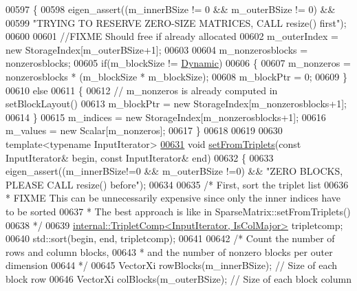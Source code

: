 \begin{DoxyCode}
00597     \{
00598       eigen\_assert((m\_innerBSize != 0 && m\_outerBSize != 0) &&
00599           \textcolor{stringliteral}{"TRYING TO RESERVE ZERO-SIZE MATRICES, CALL resize() first"});
00600 
00601       \textcolor{comment}{//FIXME Should free if already allocated}
00602       m\_outerIndex = \textcolor{keyword}{new} StorageIndex[m\_outerBSize+1];
00603 
00604       m\_nonzerosblocks = nonzerosblocks;
00605       \textcolor{keywordflow}{if}(m\_blockSize != \hyperlink{namespace_eigen_ad81fa7195215a0ce30017dfac309f0b2}{Dynamic})
00606       \{
00607         m\_nonzeros = nonzerosblocks * (m\_blockSize * m\_blockSize);
00608         m\_blockPtr = 0;
00609       \}
00610       \textcolor{keywordflow}{else}
00611       \{
00612         \textcolor{comment}{// m\_nonzeros  is already computed in setBlockLayout()}
00613         m\_blockPtr = \textcolor{keyword}{new} StorageIndex[m\_nonzerosblocks+1];
00614       \}
00615       m\_indices = \textcolor{keyword}{new} StorageIndex[m\_nonzerosblocks+1];
00616       m\_values = \textcolor{keyword}{new} Scalar[m\_nonzeros];
00617     \}
00618 
00619 
00630     \textcolor{keyword}{template}<\textcolor{keyword}{typename} InputIterator>
\hyperlink{group___sparse_core___module_aa148b63f89555f4eed312638abe597eb}{00631}     \textcolor{keywordtype}{void} \hyperlink{group___sparse_core___module_aa148b63f89555f4eed312638abe597eb}{setFromTriplets}(\textcolor{keyword}{const} InputIterator& begin, \textcolor{keyword}{const} InputIterator& end)
00632     \{
00633       eigen\_assert((m\_innerBSize!=0 && m\_outerBSize !=0) && \textcolor{stringliteral}{"ZERO BLOCKS, PLEASE CALL resize() before"});
00634 
00635       \textcolor{comment}{/* First, sort the triplet list}
00636 \textcolor{comment}{        * FIXME This can be unnecessarily expensive since only the inner indices have to be sorted}
00637 \textcolor{comment}{        * The best approach is like in SparseMatrix::setFromTriplets()}
00638 \textcolor{comment}{        */}
00639       \hyperlink{struct_eigen_1_1internal_1_1_triplet_comp}{internal::TripletComp<InputIterator, IsColMajor>} 
      tripletcomp;
00640       std::sort(begin, end, tripletcomp);
00641 
00642       \textcolor{comment}{/* Count the number of rows and column blocks,}
00643 \textcolor{comment}{       * and the number of nonzero blocks per outer dimension}
00644 \textcolor{comment}{       */}
00645       VectorXi rowBlocks(m\_innerBSize); \textcolor{comment}{// Size of each block row}
00646       VectorXi colBlocks(m\_outerBSize); \textcolor{comment}{// Size of each block column}

\end{DoxyCode}
